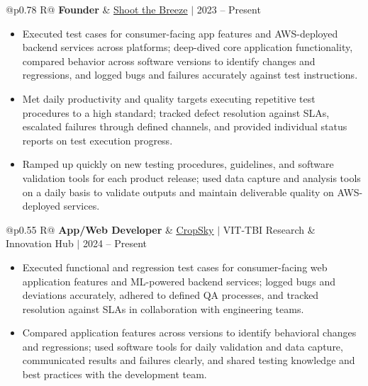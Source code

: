 \documentclass[a4paper,10pt]{article}
\newcommand{\ulink}[2]{\href{#1}{\uline{#2}}}
\newcommand{\subheading}[1]{{\color[HTML]{0A0A0A}\fontsize{12}{14}\selectfont\bfseries #1}}
\newcommand{\meta}[1]{{\color[HTML]{5C5C5C}\fontsize{10.5}{12.5}\selectfont #1}}
\begin{document}
\begin{tabularx}{\linewidth}{@{}p{0.78\linewidth} R@{}}
\subheading{Founder} & \meta{\ulink{https://shoot-the-breeze.vercel.app}{Shoot the Breeze} $|$ 2023 -- Present}
\end{tabularx}
\begin{itemize}[nosep, leftmargin=1.5em, itemsep=1pt, topsep=2pt]
\item {\color[HTML]{0A0A0A}\fontsize{11}{14}\selectfont
Executed test cases for consumer-facing app features and AWS-deployed backend services across platforms; deep-dived core application functionality, compared behavior across software versions to identify changes and regressions, and logged bugs and failures accurately against test instructions.}
\item {\color[HTML]{0A0A0A}\fontsize{11}{14}\selectfont
Met daily productivity and quality targets executing repetitive test procedures to a high standard; tracked defect resolution against SLAs, escalated failures through defined channels, and provided individual status reports on test execution progress.}
\item {\color[HTML]{0A0A0A}\fontsize{11}{14}\selectfont
Ramped up quickly on new testing procedures, guidelines, and software validation tools for each product release; used data capture and analysis tools on a daily basis to validate outputs and maintain deliverable quality on AWS-deployed services.}
\end{itemize}

\vspace{2pt}

\begin{tabularx}{\linewidth}{@{}p{0.55\linewidth} R@{}}
\subheading{App/Web Developer} & \meta{\ulink{https://sites.google.com/view/cropsky/home}{CropSky} $|$ VIT-TBI Research \& Innovation Hub $|$ 2024 -- Present}
\end{tabularx}
\begin{itemize}[nosep, leftmargin=1.5em, itemsep=1pt, topsep=2pt]
\item {\color[HTML]{0A0A0A}\fontsize{11}{14}\selectfont
Executed functional and regression test cases for consumer-facing web application features and ML-powered backend services; logged bugs and deviations accurately, adhered to defined QA processes, and tracked resolution against SLAs in collaboration with engineering teams.}
\item {\color[HTML]{0A0A0A}\fontsize{11}{14}\selectfont
Compared application features across versions to identify behavioral changes and regressions; used software tools for daily validation and data capture, communicated results and failures clearly, and shared testing knowledge and best practices with the development team.}
\end{itemize}
\end{document}
